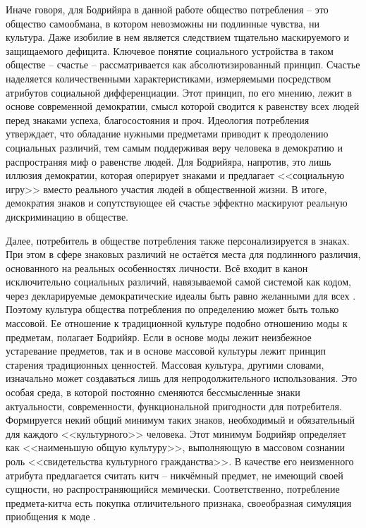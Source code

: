 Иначе говоря, для Бодрийяра в данной работе общество потребления -- это общество
самообмана, в котором невозможны ни подлинные чувства, ни культура.
Даже изобилие в нем является следствием тщательно маскируемого и защищаемого дефицита.
Ключевое понятие социального устройства в таком обществе -- счастье --
рассматривается как абсолютизированный принцип. Счастье наделяется количественными
характеристиками, измеряемыми посредством атрибутов социальной дифференциации.
Этот принцип, по его мнению, лежит в основе современной демократии, смысл которой
сводится к равенству всех людей перед знаками успеха, благосостояния и проч.
Идеология потребления утверждает, что обладание нужными предметами приводит к
преодолению социальных различий, тем самым поддерживая веру человека в демократию и
распространяя миф о равенстве людей. Для Бодрийяра, напротив, это лишь иллюзия
демократии, которая оперирует знаками и предлагает <<социальную игру>>
вместо реального участия людей в общественной жизни. В итоге, демократия знаков и
сопутствующее ей счастье эффектно маскируют реальную дискриминацию в обществе.
\autocite[][73--116]{bodriyar_society}

Далее, потребитель в обществе потребления также персонализируется в знаках.
При этом в сфере знаковых различий не остаётся места для подлинного различия,
основанного на реальных особенностях личности. Всё входит в канон исключительно
социальных различий, навязываемой самой системой как кодом, через декларируемые
демократические идеалы быть равно желанными для всех \autocite[][117--128]{bodriyar_society}.
Поэтому культура общества потребления по определению может быть только массовой. Ее отношение
к традиционной культуре подобно отношению моды к предметам, полагает Бодрийяр.
Если в основе моды лежит неизбежное устаревание предметов, так и в основе массовой
культуры лежит принцип старения традиционных ценностей. Массовая культура, другими
словами, изначально может создаваться лишь для непродолжительного использования.
Это особая среда, в которой постоянно сменяются бессмысленные знаки актуальности,
современности, функциональной пригодности для потребителя. Формируется некий общий
минимум таких знаков, необходимый и обязательный для каждого <<культурного>> человека.
Этот минимум Бодрийяр определяет как <<наименьшую общую культуру>>,
выполняющую в массовом сознании роль <<свидетельства культурного гражданства>>.
\autocite[][136--143]{bodriyar_society} В качестве его неизменного атрибута предлагается считать
китч -- никчёмный предмет, не имеющий своей сущности, но распространяющийся
мемически. Соответственно, потребление предмета-китча есть покупка отличительного признака,
своеобразная симуляция приобщения к моде \autocite[][144--146]{bodriyar_society}.

